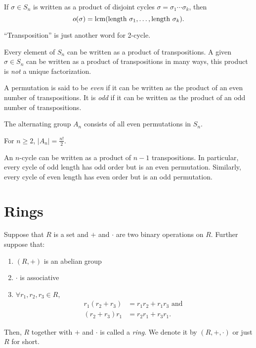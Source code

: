 \begin{fact}
	If $\sigma \in S_n$ is written as a product of disjoint cycles $\sigma =
	\sigma_1 \cdots \sigma_k$, then
	\[
		o(\sigma) = \text{lcm}(\text{length } \sigma_1, \dots, \text{length } \sigma_k).
	\]
\end{fact}

\begin{definition}
	``Transposition'' is just another word for 2-cycle.
\end{definition}

\begin{fact}
	Every element of $S_n$ can be written as a product of transpositions. A given
	$\sigma \in S_n$ can be written as a product of transpositions in many ways,
	this product is \emph{not} a unique factorization.
\end{fact}

\begin{definition}
	A permutation is said to be \emph{even} if it can be written as the product
	of an even number of transpositions. It is \emph{odd} if it can be written as
	the product of an odd number of transpositions.
\end{definition}

\begin{definition}
	The alternating group $A_n$ consists of all even permutations in $S_n$.
\end{definition}

\begin{fact}
	For $n \geq 2$, $|A_n| = \frac{n!}{2}$.
\end{fact}

\begin{fact}
	An $n$-cycle can be written as a product of $n - 1$ transpositions. In
	particular, every cycle of odd length has odd order but is an even
	permutation. Similarly, every cycle of even length has even order but is an
	odd permutation.
\end{fact}

\section*{Rings}

\begin{definition}
	Suppose that $R$ is a set and $+$ and $\cdot$ are two binary operations on
	$R$. Further suppose that:
	\begin{enumerate}
		\item $(R, +)$ is an abelian group
		\item $\cdot$ is associative
		\item $\forall r_1, r_2, r_3 \in R$,
			\begin{align*}
				r_1 (r_2 + r_3) &= r_1 r_2 + r_1 r_3 \text{ and } \\
				(r_2 + r_3) r_1 &= r_2 r_1 + r_3 r_1.
			\end{align*}
	\end{enumerate}
	Then, $R$ together with $+$ and $\cdot$ is called a \emph{ring}. We denote it
	by $(R, +, \cdot)$ or just $R$ for short.
\end{definition}

